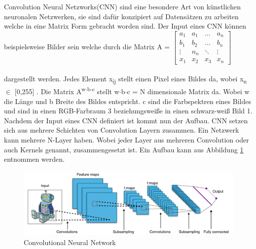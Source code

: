 \documentclass{llncs}
\begin{document}
Convolution Neural Netzworks(CNN) sind eine besondere Art von künstlichen neuronalen Netzwerken, sie sind dafür konzipiert auf Datensätzen zu arbeiten welche in eine Matrix Form gebracht worden sind. Der Input eines CNN können beispielsweise Bilder sein welche durch die Matrix A =
$
\begin{bmatrix}
a_1	& a_1	& \dots	 & a_n     \\
b_1	& b_2 	& \dots  & b_n	  \\
\vdots	& n_n 	& \ddots & \vdots \\
x_1 	& x_2 & x_3	 & x_n
\end{bmatrix}
$
\\\\dargestellt werden. Jedes Element x\textsubscript{ij} stellt einen Pixel eines Bildes da, wobei x\textsubscript{n} $\in$ [0,255] . Die Matrix A\textsuperscript{w$\cdot$b$\cdot$c} stellt w$\cdot$b$\cdot$c = N dimensionale Matrix da. Wobei w die Länge und b Breite des Bildes entspricht. c sind die Farbspektren eines Bildes und sind in einen RGB-Farbraum 3 beziehungsweiße in einen schwarz-weiß Bild 1. Nachdem  der Input eines CNN definiert ist kommt nun der Aufbau. CNN setzen sich aus mehrere Schichten von Convolution Layern zusammen. Ein Netzwerk kann mehrere N-Layer haben. Wobei jeder Layer aus mehreren Convolution oder auch Kernels genannt, zusammengesetzt ist. Ein Aufbau kann aus Abbildung \ref{fig:Bild10} entnommen werden\cite{Grundlagen}.

\begin{figure}[htbp] 
	\centering
	\includegraphics[width=1.0\textwidth]{convol.png}
	\caption{Convolutional Neural Network}
	\label{fig:Bild10}
\end{figure}
\end{document}
